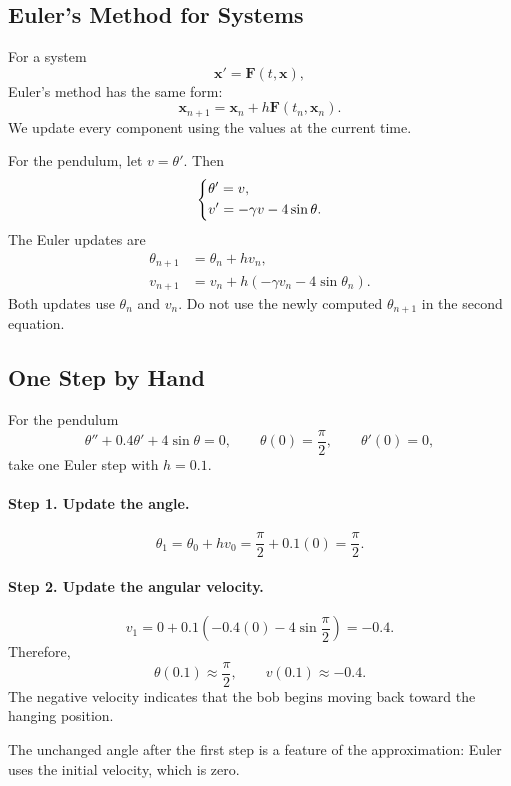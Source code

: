 \documentclass[10pt,letterpaper]{article}
\begin{document}
\subsection{Euler's Method for Systems}

For a system
\[
\mathbf{x}'=\mathbf{F}(t,\mathbf{x}),
\]
Euler's method has the same form:
\[
\boxed{
\mathbf{x}_{n+1}
=
\mathbf{x}_n+h\mathbf{F}(t_n,\mathbf{x}_n).
}
\]
We update every component using the values
at the current time.

For the pendulum, let $v=\theta'$. Then
\[
\begin{dcases}
\theta'=v,\\
v'=-\gamma v-4\sin\theta.
\end{dcases}
\]
The Euler updates are
\[
\boxed{
\begin{aligned}
\theta_{n+1}&=\theta_n+hv_n,\\
v_{n+1}&=v_n+h(-\gamma v_n-4\sin\theta_n).
\end{aligned}
}
\]
Both updates use $\theta_n$ and $v_n$.
Do not use the newly computed $\theta_{n+1}$
in the second equation.

\subsection{One Step by Hand}

\begin{example}[2]{
For the pendulum
\[
\theta''+0.4\theta'+4\sin\theta=0,
\qquad
\theta(0)=\frac{\pi}{2},
\qquad
\theta'(0)=0,
\]
take one Euler step with $h=0.1$.
}

\paragraph{Step 1. Update the angle.}
\[
\theta_1=\theta_0+hv_0
=\frac{\pi}{2}+0.1(0)
=\frac{\pi}{2}.
\]

\paragraph{Step 2. Update the angular velocity.}
\[
v_1
=0+0.1\left(-0.4(0)-4\sin\frac{\pi}{2}\right)
=-0.4.
\]
Therefore,
\[
\boxed{
\theta(0.1)\approx\frac{\pi}{2},
\qquad
v(0.1)\approx-0.4.
}
\]
The negative velocity indicates that the bob
begins moving back toward the hanging position.

The unchanged angle after the first step is a feature
of the approximation: Euler uses the initial velocity,
which is zero.
\end{example}
\end{document}
